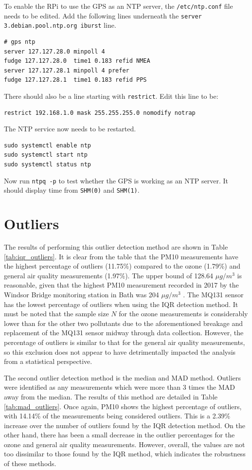\documentclass[11pt,twosided,a4paper]{report}
\begin{document}
To enable the RPi to use the GPS as an NTP server, the \texttt{/etc/ntp.conf} file needs to be edited. Add the following lines underneath the \texttt{server 3.debian.pool.ntp.org iburst} line.
\begin{lstlisting}
# gps ntp
server 127.127.28.0 minpoll 4
fudge 127.127.28.0  time1 0.183 refid NMEA
server 127.127.28.1 minpoll 4 prefer
fudge 127.127.28.1  time1 0.183 refid PPS
\end{lstlisting}
There should also be a line starting with \texttt{restrict}. Edit this line to be:
\begin{lstlisting}
restrict 192.168.1.0 mask 255.255.255.0 nomodify notrap
\end{lstlisting}
The NTP service now needs to be restarted.
\begin{lstlisting}
sudo systemctl enable ntp
sudo systemctl start ntp
sudo systemctl status ntp
\end{lstlisting}
Now run \texttt{ntpq -p} to test whether the GPS is working as an NTP server. It should display time from \texttt{SHM(0)} and \texttt{SHM(1)}.

\chapter{Outliers} \label{appendix:outliers}

The results of performing this outlier detection method are shown in Table \ref{tab:iqr_outliers}. It is clear from the table that the PM10 measurements have the highest percentage of outliers (11.75\%) compared to the ozone (1.79\%) and general air quality measurements (1.97\%). The upper bound of 128.64 $\mu g/m^3$ is reasonable, given that the highest PM10 measurement recorded in 2017 by the Windsor Bridge monitoring station in Bath was 204 $\mu g/m^3$ \citep{courthold2018max}. The MQ131 sensor has the lowest percentage of outliers when using the IQR detection method. It must be noted that the sample size $N$ for the ozone measurements is considerably lower than for the other two pollutants due to the aforementioned breakage and replacement of the MQ131 sensor midway through data collection. However, the percentage of outliers is similar to that for the general air quality measurements, so this exclusion does not appear to have detrimentally impacted the analysis from a statistical perspective.

The second outlier detection method is the median and MAD method. Outliers were identified as any measurements which were more than 3 times the MAD away from the median. The results of this method are detailed in Table \ref{tab:mad_outliers}. Once again, PM10 shows the highest percentage of outliers, with 14.14\% of the measurements being considered outliers. This is a 2.39\% increase over the number of outliers found by the IQR detection method. On the other hand, there has been a small decrease in the outlier percentages for the ozone and general air quality measurements. However, overall, the values are not too dissimilar to those found by the IQR method, which indicates the robustness of these methods.
\end{document}
